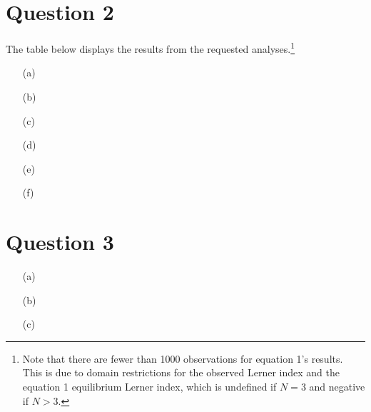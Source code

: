 \documentclass{article}
\begin{document}
\section*{Question 2}
The table below displays the results from the requested analyses.\footnote{Note that there are fewer than 1000 observations for equation 1's results. This is due to domain restrictions for the observed Lerner index and the equation 1 equilibrium Lerner index, which is undefined if ${N=3}$ and negative if ${N>3}$.}
\begin{center}
  
\end{center}
\begin{itemize}
    \item[(a)]
    \item[(b)]
    \item[(c)]
    \item[(d)]
    \item[(e)]
    \item[(f)]
\end{itemize}


\section*{Question 3}
\begin{itemize}
    \item[(a)]
    \item[(b)]
    \item[(c)]
\end{itemize}

\end{document}
